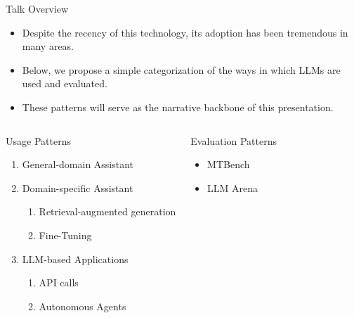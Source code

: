 \documentclass[handout]{beamer}
\begin{document}
\begin{frame}{Talk Overview}
\begin{scriptsize}
\begin{itemize}
 \item Despite the recency of this technology, its adoption has been tremendous in many areas. 
 \item Below, we propose a simple categorization of the ways in which LLMs are used and evaluated.
  \item These patterns will serve as the narrative backbone of this presentation.
\end{itemize}



\begin{columns}[t]
\begin{block}{Usage Patterns}
\begin{enumerate}
\item General-domain Assistant
\item Domain-specific Assistant
\begin{enumerate}\scriptsize
\item Retrieval-augmented generation
\item Fine-Tuning
\end{enumerate}
\item LLM-based Applications
\begin{enumerate}\scriptsize
\item API calls
\item Autonomous Agents
\end{enumerate}
\end{enumerate}
\end{block}

\begin{block}{Evaluation Patterns}
\begin{itemize}
\item MTBench
\item LLM Arena
\end{itemize}
\end{block}

\end{columns}

\end{scriptsize}
\end{frame}
\end{document}
